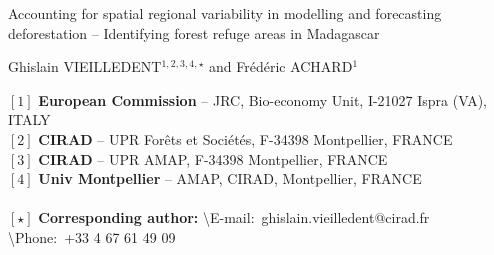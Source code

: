 \begin{center}
  \LARGE{Accounting for spatial regional variability in modelling and forecasting deforestation -- Identifying forest refuge areas in Madagascar}
\end{center}

\vspace{1cm}

\begin{center}
  \large{Ghislain VIEILLEDENT$^{1,2,3,4,\star}$ and Frédéric ACHARD$^{1}$}
\end{center}

\vspace{1cm}

{\small
  \begin{flushleft}  
    $[1]$ \textbf{European Commission} -- JRC, Bio-economy Unit, I-21027 Ispra (VA), ITALY\\
    $[2]$ \textbf{CIRAD} -- UPR Forêts et Sociétés, F-34398 Montpellier, FRANCE\\
    $[3]$ \textbf{CIRAD} -- UPR AMAP, F-34398 Montpellier, FRANCE\\
    $[4]$ \textbf{Univ Montpellier} -- AMAP, CIRAD, Montpellier, FRANCE\\
    ~\\
    $[\star]$ \textbf{Corresponding author:}
    \textbackslash{E-mail}:~ghislain.vieilledent@cirad.fr
    \textbackslash{Phone}:~+33 4 67 61 49 09\\
  \end{flushleft}}
\newpage
